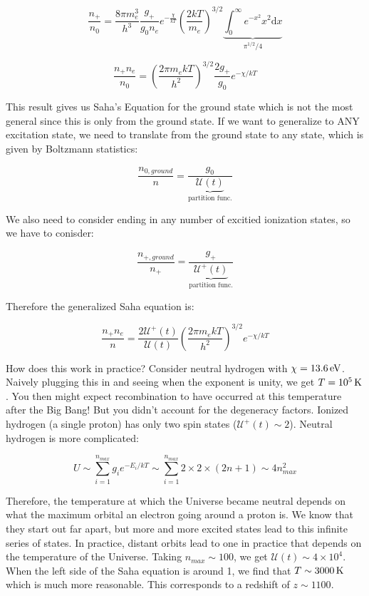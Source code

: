 \documentclass{article}
\newcommand{\unit}[1]{{\,\rm #1}}
\newcommand{\ev}{\unit{eV}}
\newcommand{\K}{\unit{K}}
\begin{document}
$$
\frac{n_+}{n_0} = \frac{8\pi m_e^3}{h^3 }\frac{g_+}{g_0 n_e } e^{-\frac{\chi}{kT}} \left(\frac{2kT}{m_e}\right)^{3/2} \underbrace{\int_0^{\infty} e^{-x^2} x^2 \mathrm{d} x}_{\pi^{1/2}/4}
$$

$$
\frac{n_+ n_e}{n_0} = \left(\frac{2 \pi m_e k T}{h^2}\right)^{3/2} \frac{2g_+}{g_0}e^{-\chi/kT}
$$

This result gives us Saha's Equation for the ground state which is not the most general since this is only from the ground state. If we want to generalize to ANY excitation state, we need to translate from the ground state to any state, which is given by Boltzmann statistics:

$$
\frac{n_{0,ground}}{n} = \frac{g_0}{\underbrace{\mathcal{U}(t)}_\text{partition func.}}
$$

We also need to consider ending in any number of excitied ionization states, so we have to conisder:

$$
\frac{n_{+,ground}}{n_+} = \frac{g_+}{\underbrace{\mathcal{U}^+(t)}_\text{partition func.}}
$$

Therefore the generalized Saha equation is:

$$
\frac{n_+ n_e}{n} = \frac{2 \mathcal{U}^+(t)}{\mathcal{U}(t)} \left(\frac{2 \pi m_e k T}{h^2}\right)^{3/2} e^{-\chi/kT}
$$

How does this work in practice? Consider neutral hydrogen with $\chi = 13.6 \ev$. Naively plugging this in and seeing when the exponent is unity, we get $T = 10^{5} \K$. You then might expect recombination to have occurred at this temperature after the Big Bang! But you didn't account for the degeneracy factors. Ionized hydrogen (a single proton) has only two spin states ($\mathcal{U}^+(t) \sim 2$). Neutral hydrogen is more complicated:

$$
U \sim \sum_{i=1}^{n_{max}} g_i e^{-E_i/kT} \sim \sum_{i=1}^{n_{max}} 2 \times 2 \times (2n+1)\sim 4 n_{max}^2
$$

Therefore, the temperature at which the Universe became neutral depends on what the maximum orbital an electron going around a proton is. We know that they start out far apart, but more and more excited states lead to this infinite series of states. In practice, distant orbits lead to one in practice that depends on the temperature of the Universe. Taking $n_{max} \sim 100$, we get $\mathcal{U}(t) \sim 4 \times 10^4$. When the left side of the Saha equation is around 1, we find that $T \sim 3000 \K$ which is much more reasonable. This corresponds to a redshift of $z \sim 1100$. 
\end{document}

